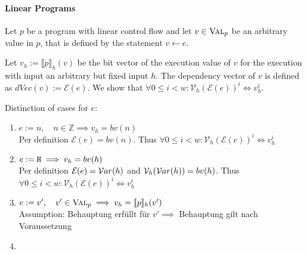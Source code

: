 \paragraph{Linear Programs}
Let $p$ be a program with linear control flow and let $v \in \textsc{Val}_p$ be an arbitrary value in $p$, that is defined by the statement $v \leftarrow e$.

Let $v_h := \llbracket p \rrbracket_h(v)$ be the bit vector of the execution value of $v$ for the execution with input an arbitrary but fixed input $h$. The dependency vector of $v$ is defined as $dVec(v) := \mathcal{E}(e)$. We show that $\forall 0 \leq i < w: \mathcal{V}_h(\mathcal{E}(e))^i \iff v_h^i$.

Distinction of cases for $e$:
\begin{enumerate}
    \item $e := n, \quad n \in \mathbb{Z} \implies v_h = bv(n)$\\
    Per definition $\mathcal{E}(e) = bv(n)$. Thus $\forall 0 \leq i < w: \mathcal{V}_h(\mathcal{E}(e))^i \iff v_h^i$
    
    
    \item $e := \mathtt{H} \implies v_h = bv(h)$\\
    Per definition $\mathcal{E}(e) = \mathcal{V}ar(h)$ and $\mathcal{V}_h(\mathcal{V}ar(h)) = bv(h)$. Thus\\ $\forall 0 \leq i < w: \mathcal{V}_h(\mathcal{E}(e))^i \iff v_h^i$
    
    
    \item $e := v', \quad v' \in \textsc{Val}_p \implies v_h = \llbracket p \rrbracket_h (v')$\\
    Assumption: Behauptung erfüllt für $v' \implies$ Behauptung gilt nach Voraussetzung
    
    \item 
    
\end{enumerate}
